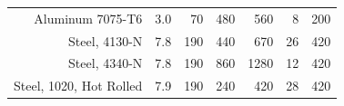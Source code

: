 \begin{table}[H]
\begin{tabular}{rrrrrrr}
Aluminum 7075-T6                                                               & 3.0                                                                                                          & 70                                                                                            & 480                                                                                    & 560                                                                                  & 8                                                                                       & 200                                                                                           \\
Steel, 4130-N                                                                  & 7.8                                                                                                          & 190                                                                                           & 440                                                                                    & 670                                                                                  & 26                                                                                        & 420                                                                                           \\
Steel, 4340-N                                                                  & 7.8                                                                                                          & 190                                                                                           & 860                                                                                    & 1280                                                                                 & 12                                                                                        & 420                                                                                           \\
Steel, 1020, Hot Rolled                                                        & 7.9                                                                                                          & 190                                                                                           & 240                                                                                    & 420                                                                                  & 28                                                                                        & 420                                                                                           \\

\end{tabular}
\end{table}
